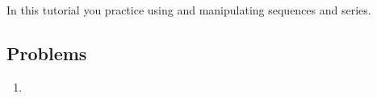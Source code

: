 		
\begin{objectives}
	In this tutorial you practice using and manipulating sequences and series.
\end{objectives}

	\vspace{-1em}
\subsection*{Problems}
\begin{enumerate}
	\item %
\end{enumerate}